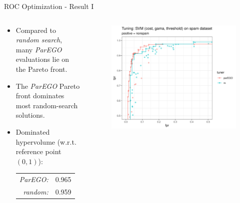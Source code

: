 \documentclass[11pt,compress,t,notes=noshow,xcolor=table]{beamer}
\begin{document}
\begin{vbframe}{ROC Optimization - Result I}

\begin{columns}
\begin{column}{0.45\textwidth}
\begin{itemize}
  \item Compared to \emph{random search}, many \emph{ParEGO} evaluations lie on the Pareto front.
  \item The \emph{ParEGO} Pareto front dominates most random-search solutions.
  \item Dominated hypervolume (w.r.t. reference point $(0,1)$):
  \begin{tabular}{rl}
    \emph{ParEGO:} & 0.965\\
    \emph{random:} & 0.959
  \end{tabular}
\end{itemize}
\end{column}
\begin{column}{0.55\textwidth}
\begin{figure}
\includegraphics[width=\textwidth]{figure_man/example_parego_spam.png}
\end{figure}
\end{column}
\end{columns}

\end{vbframe}
\end{document}

